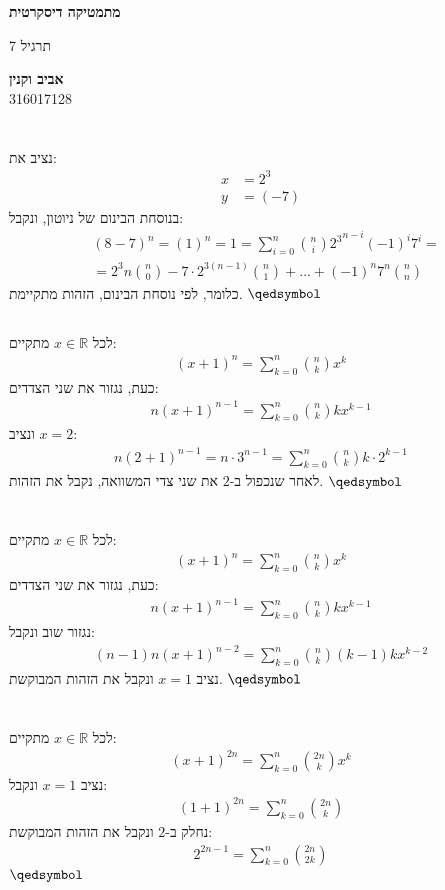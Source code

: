 \documentclass[a4paper, 12pt, leqno]{article}
\newcommand{\sub}[1]{\subsection{\underline{#1}}}
\newcommand{\RR}{\ensuremath{\mathbb{R}}}
\newcommand{\eq}[1]{\begin{align*}#1\end{align*}}
\renewcommand{\qed}{\hfill\(\qedsymbol\)}
\begin{document}
\begin{titlepage}
    \begin{center}
        \vspace*{4cm}
    
        {\fontsize{32pt}{32pt}\selectfont \textbf{מתמטיקה דיסקרטית}}
        
        \vspace{0.4cm}
        
        {\LARGE
        תרגיל 7}
    
        \vfill
            
        {
            \Large\textbf{אביב וקנין}
            \\
            316017128
        }
    \end{center}
\end{titlepage}

\section{}
\sub{}
נציב את:
\eq{
    x&=2^3\\
    y&=(-7)
}
בנוסחת הבינום של ניוטון, ונקבל:
\eq{
    &(8-7)^n=(1)^n=1=\sum^n_{i=0}\binom{n}{i}{2^3}^{n-i}(-1)^i7^i=\\
    &=2^3n\binom{n}{0}-7\cdot2^{3(n-1)}\binom{n}{1}+...+(-1)^n7^n\binom{n}{n}
}
כלומר, לפי נוסחת הבינום, הזהות מתקיימת.
\qed
\sub{}
לכל $x\in\RR$ מתקיים:
\eq{
    (x+1)^n=\sum_{k=0}^n\binom{n}{k}x^k
}
כעת, נגזור את שני הצדדים:
\eq{
    n(x+1)^{n-1}=\sum_{k=0}^n\binom{n}{k}kx^{k-1}
}
ונציב $x=2$:
\eq{
    n(2+1)^{n-1}=n\cdot3^{n-1}=\sum_{k=0}^n\binom{n}{k}k\cdot2^{k-1}
}
לאחר שנכפול ב-$2$ את שני צדי המשוואה, נקבל את הזהות.
\qed

\section{}
לכל $x\in\RR$ מתקיים:
\eq{
    (x+1)^n=\sum_{k=0}^n\binom{n}{k}x^k
}
כעת, נגזור את שני הצדדים:
\eq{
    n(x+1)^{n-1}=\sum_{k=0}^n\binom{n}{k}kx^{k-1}
}
נגזור שוב ונקבל:
\eq{
    (n-1)n(x+1)^{n-2}=\sum_{k=0}^n\binom{n}{k}(k-1)kx^{k-2}
}
נציב $x=1$ ונקבל את הזהות המבוקשת.
\qed

\section{}
לכל $x\in\RR$ מתקיים:
\eq{
    (x+1)^{2n}=\sum_{k=0}^n\binom{2n}{k}x^k
}
נציב $x=1$ ונקבל:
\eq{
    (1+1)^{2n}=\sum_{k=0}^n\binom{2n}{k}
}
נחלק ב-$2$ ונקבל את הזהות המבוקשת:
\eq{
    2^{2n-1}=\sum_{k=0}^n\binom{2n}{2k}
}
\qed
\end{document}
